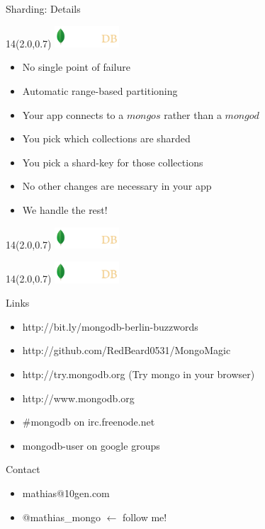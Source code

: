 \documentclass{beamer}
\newcommand{\MongoLogo}{
\begin{textblock}{14}(2.0,0.7)
  \includegraphics[height=0.8cm]{logo-mongodb-ondark.png}
\end{textblock}
}
\begin{document}
\begin{frame}[fragile]{Sharding: Details}
  \MongoLogo
  \begin{itemize}
    \item No single point of failure
    \item Automatic range-based partitioning
    \item Your app connects to a $mongos$ rather than a $mongod$
    \item You pick which collections are sharded
    \item You pick a shard-key for those collections
    \item No other changes are necessary in your app
    \item We handle the rest!
  \end{itemize}
\end{frame}

\begin{frame}
  \MongoLogo
  \center
\end{frame}

\begin{frame}
  \MongoLogo


  \begin{block}{Links}
  \begin{itemize}
    \item http://bit.ly/mongodb-berlin-buzzwords
    \item http://github.com/RedBeard0531/MongoMagic
    \item http://try.mongodb.org (Try mongo in your browser)
    \item http://www.mongodb.org
    \item \#mongodb on irc.freenode.net
    \item mongodb-user on google groups
  \end{itemize}
  \end{block}

  \begin{block}{Contact}
  \begin{itemize}
    \item mathias@10gen.com
    \item @mathias\_mongo ${\leftarrow}$ follow me!
  \end{itemize}
  \end{block}
\end{frame}
\end{document}

